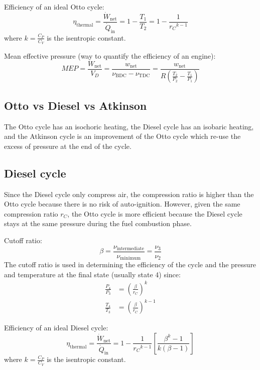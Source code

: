 \documentclass[10pt, twocolumn]{article}
\begin{document}
Efficiency of an ideal Otto cycle:
\[
  \eta_\mathrm{thermal} = \frac{\dot{W}_\mathrm{net}}{\dot{Q}_\mathrm{in}} = 1 - \frac{T_1}{T_2} = 1 - \frac{1}{{r_C}^{k - 1}}
\]
where \(k= \frac{C_P}{C_V}\) is the isentropic constant.


Mean effective pressure (way to quantify the efficiency of an engine):
\[
  MEP = \frac{W_\mathrm{net}}{V_D} = \frac{w_\mathrm{net}}{\nu_\mathrm{BDC} - \nu_\mathrm{TDC}} = \frac{w_\mathrm{net}}{R\left(\frac{T_2}{P_2} - \frac{T_1}{P_1} \right)}
\]


\subsection{Otto vs Diesel vs Atkinson}
The Otto cycle has an isochoric heating, the Diesel cycle has an isobaric heating, and the Atkinson cycle is an improvement of the Otto cycle which re-use the excess of pressure at the end of the cycle.


\subsection{Diesel cycle}
Since the Diesel cycle only compress air, the compression ratio is higher than the Otto cycle because there is no risk of auto-ignition.
However, given the same compression ratio \(r_C\), the Otto cycle is more efficient because the Diesel cycle stays at the same pressure during the fuel combustion phase.

Cutoff ratio:
\[
  \beta = \frac{\nu_\mathrm{intermediate}}{\nu_\mathrm{minimum}} = \frac{\nu_3}{\nu_2}
\]
The cutoff ratio is used in determining the efficiency of the cycle and the pressure and temperature at the final state (usually state 4) since:
\begin{align*}
  \frac{P_4}{P_3} & = \left( \frac{\beta}{r_C} \right)^k       \\
  \frac{T_4}{T_3} & = \left( \frac{\beta}{r_C} \right)^{k - 1}
\end{align*}

Efficiency of an ideal Diesel cycle:
\[
  \eta_\mathrm{thermal} = \frac{\dot{W}_\mathrm{net}}{\dot{Q}_\mathrm{in}} = 1 - \frac{1}{{r_C}^{k - 1}} \left[ \frac{\beta^k - 1}{k (\beta - 1)} \right]
\]
where \(k= \frac{C_P}{C_V}\) is the isentropic constant.
\end{document}
